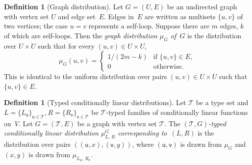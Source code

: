 \documentclass[11pt]{article}
\theoremstyle{definition}
\newtheorem{definition}[theorem]{Definition}
\newcommand{\type}{\mathcal{T}}
\newcommand{\tvarstyle}[1]{\mathsf{#1}}
\newcommand{\lvar}{\ensuremath{\tvarstyle{u}}}
\newcommand{\rvar}{\ensuremath{\tvarstyle{v}}}
\begin{document}
\begin{definition}[Graph distribution]
  \label{def:graph-distribution}
  Let $G = (U, E)$ be an undirected graph with vertex set $U$ and edge set~$E$.
  Edges in~$E$ are written as multisets $\{u, v\}$ of two vertices; the case $u
  = v$ represents a self-loop.
  Suppose there are $m$ edges, $k$ of which are self-loops.
  Then the \emph{graph distribution $\mu_G$ of~$G$} is the distribution over
  $U\times U$ such that for every $(u, v)\in U\times U$,
  \begin{equation*}
    \mu_G(u, v) =
    \begin{cases}
      1/(2m-k) & \text{if $\{u, v\} \in E$},\\
      0 & \text{otherwise}.
    \end{cases}
  \end{equation*}
  This is identical to the uniform distribution over pairs $(u, v)\in U\times U$
  such that $\{u, v\} \in E$.
\end{definition}

\begin{definition}[Typed conditionally linear distributions]
  Let $\type$ be a type set and
  $L=\{L_\lvar\}_{\lvar\in\type},R=\{R_\rvar\}_{\rvar\in\type}$ be $\type$-typed
  families of conditionally linear functions on~$V$.
  Let $G = (\type, E)$ be a graph with vertex set $\type$.
  The \emph{$(\type, G)$-typed conditionally linear distribution $\mu_{L,\,
      R}^G$ corresponding to~$(L, R)$} is the distribution over pairs $( (\lvar,
  x), (\rvar, y) )$, where $(\lvar, \rvar)$ is drawn from $\mu_G$ and $(x,y)$ is
  drawn from $\mu_{L_\lvar,\, R_\rvar}$.
\end{definition}
\end{document}
